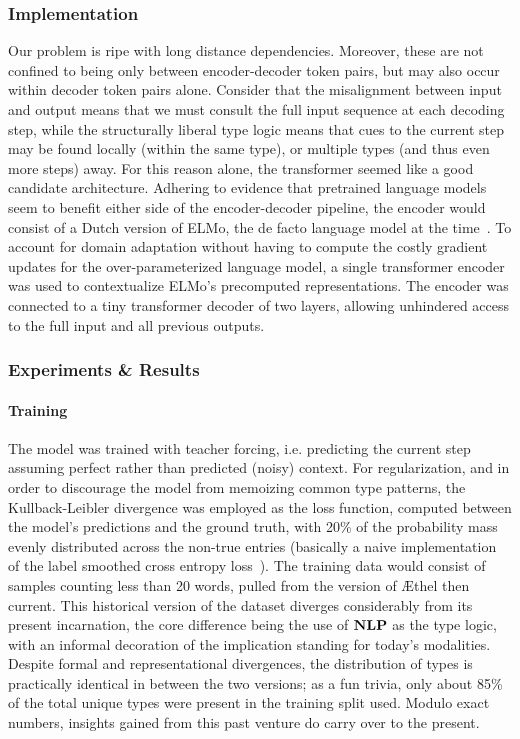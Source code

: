 \subsubsection{Implementation}
Our problem is ripe with long distance dependencies.
Moreover, these are not confined to being only between encoder-decoder token pairs, but may also occur within decoder token pairs alone.
Consider that the misalignment between input and output means that we must consult the full input sequence at each decoding step, while the structurally liberal type logic means that cues to the current step may be found locally (within the same type), or multiple types (and thus even more steps) away.
For this reason alone, the transformer seemed like a good candidate architecture.
Adhering to evidence that pretrained language models seem to benefit either side of the encoder-decoder pipeline, the encoder would consist of a Dutch version of ELMo, the de facto language model at the time~\cite{peters-etal-2018-deep,che-etal-2018-towards}.
To account for domain adaptation without having to compute the costly gradient updates for the over-parameterized language model, a single transformer encoder was used to contextualize ELMo's precomputed representations.
The encoder was connected to a tiny transformer decoder of two layers, allowing unhindered access to the full input and all previous outputs.

\subsubsection{Experiments \& Results}
\paragraph{Training}
The model was trained with teacher forcing, i.e. predicting the current step assuming perfect rather than predicted (noisy) context.
For regularization, and in order to discourage the model from memoizing common type patterns, the Kullback-Leibler divergence was employed as the loss function, computed between the model's predictions and the ground truth, with 20\% of the probability mass evenly distributed across the non-true entries (basically a naive implementation of the label smoothed cross entropy loss~\cite{szegedy2016rethinking}).
The training data would consist of samples counting less than 20 words, pulled from the version of \AE thel then current.
This historical version of the dataset diverges considerably from its present incarnation, the core difference being the use of $\textbf{NLP}$ as the type logic, with an informal decoration of the implication standing for today's modalities.
Despite formal and representational divergences, the distribution of types is practically identical in between the two versions; as a fun trivia, only about 85\% of the total unique types were present in the training split used.
Modulo exact numbers, insights gained from this past venture do carry over to the present.

